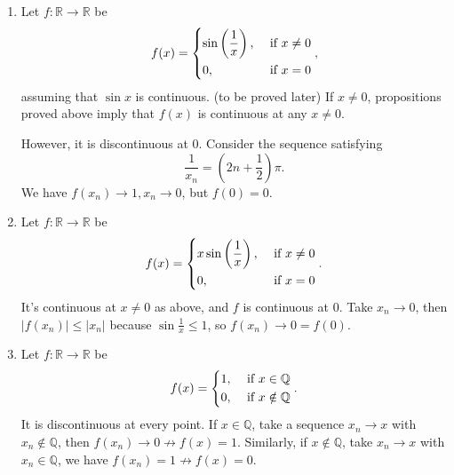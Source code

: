 \begin{example}
    \leavevmode
    \begin{enumerate}
        \item Let \(f: \mathbb{R}\to \mathbb{R}\) be
        \[
            f(x) = \begin{dcases}
                \sin \left(\frac{1}{x}\right), &\text{ if } x\neq 0\\
                0, &\text{ if } x = 0\\
            \end{dcases},
        \]
        assuming that \(\sin x\) is continuous. (to be proved later) If \(x\neq 0\), propositions proved above imply that \(f(x)\) is continuous at any \(x \neq 0\).

        However, it is discontinuous at \(0\). Consider the sequence satisfying
        \[\frac{1}{x_n} = (2n + \frac{1}{2})\pi.\]
        We have \(f(x_n) \to 1, x_n \to 0\), but \(f(0)= 0\).
        \item Let \(f: \mathbb{R}\to \mathbb{R}\) be
        \[
            f(x) = \begin{dcases}
                x \sin\left(\frac{1}{x}\right), &\text{ if } x\neq 0\\
                0, &\text{ if } x = 0\\
            \end{dcases}.
        \]
        It's continuous at \(x\neq 0\) as above, and \(f\) is continuous at \(0\). Take \(x_n \to 0\), then \(\left\vert f(x_n) \right\vert \leq \left\vert x_n \right\vert \) because \(\sin \frac{1}{x} \leq 1\), so \(f(x_n) \to 0 = f(0)\).
        \item Let \(f: \mathbb{R}\to \mathbb{R}\) be
        \[
            f(x) = \begin{dcases}
                1, &\text{ if } x \in \mathbb{Q}\\
                0, &\text{ if } x \notin \mathbb{Q}\\
            \end{dcases}.
        \]
        It is discontinuous at every point. If \(x \in \mathbb{Q}\), take a sequence \(x_n \to x\) with \(x_n \notin \mathbb{Q}\), then \(f(x_n) \to 0 \not \to f(x) = 1\). Similarly, if \(x \notin \mathbb{Q}\), take \(x_n \to x\) with \(x_n \in \mathbb{Q}\), we have \(f(x_n) = 1 \not \to f(x) = 0\).
    \end{enumerate}
\end{example}